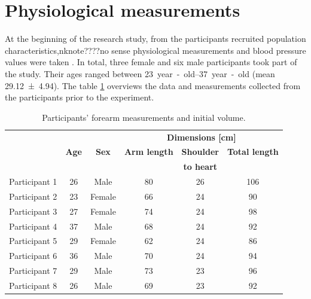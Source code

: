 
\section{Physiological measurements}
\label{section results 1}
At the beginning of the research study, from the participants recruited population characteristics,nknote{????no sense} physiological measurements and blood pressure values were taken . In total, three female and six male participants took part of the study. Their ages ranged between \SIrange{23}{37}{year-old} (mean \num{29.12(494)}). The table \ref{tbl:physiological} overviews the data and measurements collected from the participants prior to the experiment.

\begin{table}[!htbp] %
	\caption{Participants' forearm measurements and initial volume.}
	\label{tbl:physiological}
	\centering
	\begin{tabular}{lcc|ccc}
		\toprule
		&              &              &         \multicolumn{3}{c}{\textbf{Dimensions [\si{\cm}]}}         \\
		& \textbf{Age} & \textbf{Sex} & \textbf{Arm length} & \textbf{Shoulder} & \textbf{Total length} \\
		&              &              &                     &  \textbf{to heart}   &                       \\ \midrule
		Participant 1 &      26      &     Male     &         80          &          26          &          106          \\
		Participant 2 &      23      &    Female    &         66          &          24          &          90           \\
		Participant 3 &      27      &    Female    &         74          &          24          &          98           \\
		Participant 4 &      37      &     Male     &         68          &          24          &          92           \\
		Participant 5 &      29      &    Female    &         62          &          24          &          86           \\
		Participant 6 &      36      &     Male     &         70          &          24          &          94           \\
		Participant 7 &      29      &     Male     &         73          &          23          &          96           \\
		Participant 8 &      26      &     Male     &         69          &          23          &          92           \\ \bottomrule
	\end{tabular}
\end{table}

